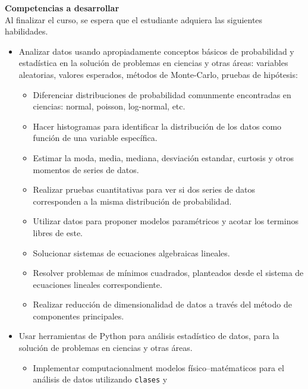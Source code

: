 \documentclass[letterpaper,10pt,onecolumn]{article}
\begin{document}
\noindent\textbf{\large {} \quad Competencias a
  desarrollar}\\[-0.2cm] 


\noindent\normalsize Al finalizar el curso, se espera que el
estudiante adquiera las siguientes habilidades. 

\begin{itemize}
\item Analizar datos usando apropiadamente conceptos
  b\'asicos de probabilidad y estad\'istica en la soluci\'on de
  problemas en ciencias y otras \'areas: variables aleatorias, valores
  esperados, m\'etodos de Monte-Carlo, pruebas de hip\'otesis: 
 \begin{itemize}
  \item Diferenciar distribuciones de probabilidad comunmente
    encontradas en ciencias: normal, poisson, log-normal, etc. 
  \item Hacer histogramas para identificar la distribuci\'on de los
    datos como funci\'on de una variable espec\'ifica. 
  \item Estimar la moda, media, mediana, desviaci\'on estandar,
    curtosis y otros momentos de series de datos. 
  \item Realizar pruebas cuantitativas para ver si dos series de datos
    corresponden a la misma distribuci\'on de probabilidad. 
  \item Utilizar datos para proponer modelos param\'etricos y acotar
    los terminos libres de este.  
  \item Solucionar sistemas de ecuaciones algebraicas lineales.  
  \item Resolver problemas de m\'inimos cuadrados, planteados desde el
    sistema de ecuaciones lineales correspondiente. 
  \item Realizar reducci\'on de dimensionalidad de datos a trav\'es
    del m\'etodo de componentes principales. 
 \end{itemize}
\item Usar herramientas de Python para an\'alisis estad\'istico de
  datos, para la soluci\'on de problemas en ciencias y otras
  \'areas.\\[-0.6cm] 
\begin{itemize}
   \item Implementar computacionalment modelos f\'isico--mat\'ematicos
     para el an\'alisis de datos utilizando \texttt{clases} y

\end{itemize}
\end{itemize}
\end{document}
